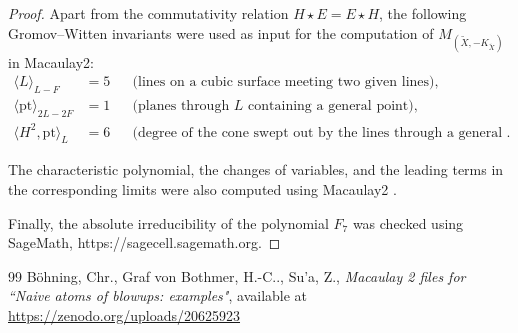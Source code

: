 \documentclass[10pt,a4paper]{amsart}
\numberwithin{equation}{section}
\begin{document}
\begin{proof}
Apart from the commutativity relation $H \star E = E \star H$, the following
Gromov--Witten invariants were used as input for the computation of
$M_{(\widetilde{X},-K_{\widetilde{X}})}$ in Macaulay2:
\begin{align*}
    \langle L \rangle_{L-F}
        &= 5
        && \text{(lines on a cubic surface meeting two given lines)}, \\
    \langle \mathrm{pt} \rangle_{2L-2F}
        &= 1
        && \text{(planes through $L$ containing a general point)}, \\
    \langle H^2,\mathrm{pt}\rangle_L
        &= 6
        && \text{(degree of the cone swept out by the lines through a general point)}.
\end{align*}

The characteristic polynomial, the changes of variables, and the leading
terms in the corresponding limits were also computed using Macaulay2 \cite{BvBS26}.

Finally, the absolute irreducibility of the polynomial $F_7$ was checked using SageMath, {\ttfamily https://sagecell.sagemath.org}.
\end{proof}


\begin{thebibliography}{99}
 B\"ohning, Chr., Graf von Bothmer, H.-C.., Su'a, Z., \emph{Macaulay 2 files for ``Naive atoms of blowups: examples"}, available at \href{https://zenodo.org/uploads/20625923}{https://zenodo.org/uploads/20625923}
\end{thebibliography}
\end{document}
